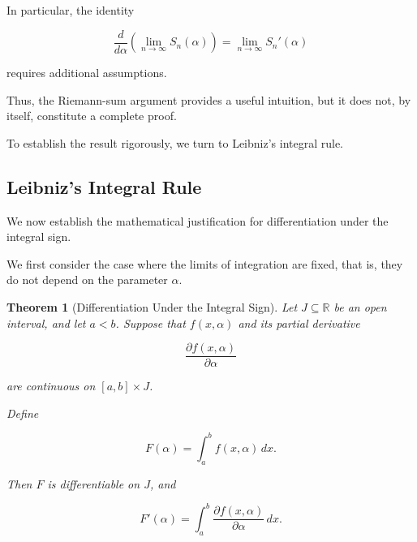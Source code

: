 \documentclass[11pt,a4paper]{article}
\newtheorem{theorem}{Theorem}[section]
\theoremstyle{definition}
\theoremstyle{remark}
\begin{document}
In particular, the identity

\[
    \frac{d}{d\alpha}
    \left(
    \lim_{n\to\infty}S_n(\alpha)
    \right)
    =
    \lim_{n\to\infty}S_n'(\alpha)
\]

requires additional
assumptions.

Thus, the Riemann-sum
argument provides a useful
intuition, but it does not,
by itself, constitute
a complete proof.

To establish the result
rigorously, we turn to
Leibniz's integral rule.


\subsection{Leibniz's Integral Rule}

We now establish the mathematical
justification for differentiation
under the integral sign.

We first consider the case where
the limits of integration are fixed,
that is, they do not depend on
the parameter $\alpha$.

\begin{theorem}[Differentiation Under the Integral Sign]

Let $J\subseteq\mathbb{R}$ be an
open interval, and let $a<b$.
Suppose that $f(x,\alpha)$
and its partial derivative

\[
    \frac{\partial f(x,\alpha)}
         {\partial\alpha}
\]

are continuous on $[a,b]\times J$.

Define

\[
    F(\alpha)
    =
    \int_a^b f(x,\alpha)\,dx.
\]

Then $F$ is differentiable
on $J$, and

\begin{equation}
    \boxed{
    F'(\alpha)
    =
    \int_a^b
    \frac{\partial f(x,\alpha)}
         {\partial\alpha}\,dx.
    }
    \label{eq:leibniz_theorem}
\end{equation}

\end{theorem}
\end{document}
